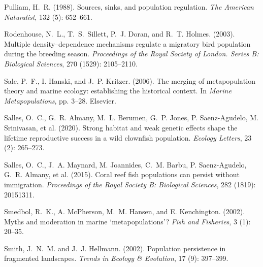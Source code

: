 \documentclass[12pt, oneside]{article}   	%
\begin{document}
\begin{thebibliography}{66}
Pulliam, H.~R. (1988).
\newblock Sources, sinks, and population regulation.
\newblock \emph{The American Naturalist}, 132 (5): 652--661.

Rodenhouse, N.~L., T.~S.~Sillett, P.~J. Doran, and R.~T. Holmes. (2003).
\newblock Multiple density--dependence mechanisms regulate a migratory bird
  population during the breeding season.
\newblock \emph{Proceedings of the Royal Society of London. Series B:
  Biological Sciences}, 270 (1529): 2105--2110.

Sale, P.~F., I. Hanski, and J.~P. Kritzer. (2006).
\newblock The merging of metapopulation theory and marine ecology: establishing
  the historical context.
\newblock In \emph{Marine Metapopulations}, pp. 3--28. Elsevier.

Salles, O.~C., G.~R. Almany, M.~L. Berumen, G.~P. Jones, P.
  Saenz-Agudelo, M. Srinivasan, et al. (2020).
\newblock Strong habitat and weak genetic effects shape the lifetime
  reproductive success in a wild clownfish population.
\newblock \emph{Ecology Letters}, 23 (2): 265--273.

Salles, O.~C., J.~A. Maynard, M. Joannides, C.~M. Barbu, P.
  Saenz-Agudelo, G.~R. Almany, et al. (2015).
\newblock Coral reef fish populations can persist without immigration.
\newblock \emph{Proceedings of the Royal Society B: Biological Sciences},
  282 (1819): 20151311.

Smedbol, R.~K., A. McPherson, M.~M. Hansen, and E. Kenchington. (2002).
\newblock Myths and moderation in marine ‘metapopulations’?
\newblock \emph{Fish and Fisheries}, 3 (1): 20--35.

Smith, J.~N.~M. and J.~J. Hellmann. (2002).
\newblock Population persistence in fragmented landscapes.
\newblock \emph{Trends in Ecology \& Evolution}, 17 (9):
  397--399.


\end{thebibliography}
\end{document}
